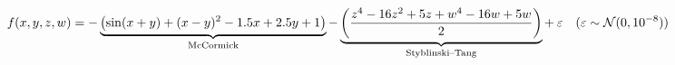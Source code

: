 \documentclass[]{article}
\let\originalleft\left
\let\originalright\right
\renewcommand{\left}{\mathopen{}\mathclose\bgroup\originalleft}
\renewcommand{\right}{\aftergroup\egroup\originalright}
\begin{document}
\[
f(x,y,z,w) = -\underbrace{\left(\sin(x+y) + (x-y)^2 - 1.5x+2.5y+1\right)}_{\text{McCormick}}-\underbrace{\left(\frac{z^4 - 16z^2 + 5z + w^4 - 16w + 5w}{2}\right)}_\text{Styblinski–Tang}+\:\varepsilon \quad (\varepsilon \sim \mathcal{N}(0,10^{-8}))
\]
\end{document}
